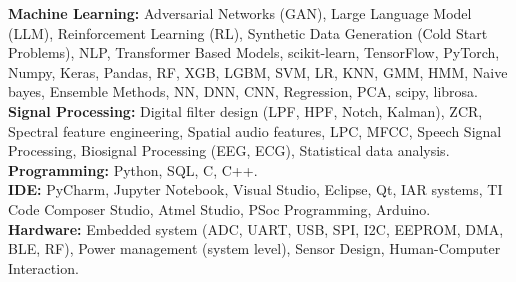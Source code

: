 \textbf{Machine Learning: } Adversarial Networks (GAN), Large Language Model (LLM), Reinforcement Learning (RL), Synthetic Data Generation (Cold Start Problems), NLP, Transformer Based Models, scikit-learn, TensorFlow, PyTorch, Numpy, Keras, Pandas, RF, XGB, LGBM, SVM, LR, KNN, GMM, HMM, Naive bayes, Ensemble Methods, NN, DNN, CNN, Regression, PCA, scipy, librosa.\\
\textbf{Signal Processing: }Digital filter design (LPF, HPF, Notch, Kalman), ZCR, Spectral feature engineering, Spatial audio features, LPC, MFCC, Speech Signal Processing, Biosignal Processing (EEG, ECG), Statistical data analysis.\\
\textbf{Programming: }Python, SQL, C, C++.\\
\textbf{IDE: } PyCharm, Jupyter Notebook, Visual Studio, Eclipse, Qt, IAR systems, TI Code Composer Studio, Atmel Studio, PSoc Programming, Arduino.\\
\textbf{Hardware: }Embedded system (ADC, UART, USB, SPI, I2C, EEPROM, DMA, BLE, RF), Power management (system level), Sensor Design, Human-Computer Interaction.\\
